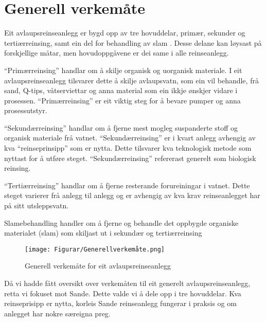 \section{Generell verkemåte}

Eit avlaupsreinseanlegg er bygd opp av tre hovuddelar, primær, sekunder og tertiærreinsing,
samt ein del for behandling av slam \citep{Regjeriga}.
Desse delane kan løysast på forskjellige måtar, men hovudoppgåvene er dei same
i alle reinseanlegg.

``Primærreinsing'' handlar om å skilje organisk og uorganisk materiale.
I eit avlaupsreinseanlegg tilsvarer dette å skilje avlaupsvatn, 
som ein vil behandle, frå sand, Q-tips, våtserviettar og anna material som ein ikkje ønskjer vidare i prosessen.\newline
``Primærreinsing'' er eit viktig steg for å bevare pumper og anna prosessutstyr.

``Sekundærreinsing'' handlar om å fjerne mest mogleg suspanderte stoff og organisk materiale frå vatnet.
``Sekundærreinsing'' er i kvart anlegg avhengig av kva ``reinseprinsipp'' som er nytta. 
Dette tilsvarer kva teknologisk metode som nyttast for å utføre steget.
``Sekundærreinsing'' refererast generelt som biologisk reinsing.

``Tertiærreinsing'' handlar om å fjerne resterande forureiningar i vatnet.
Dette steget varierer frå anlegg til anlegg og er
avhengig av kva krav reinseanlegget har på sitt utsleppsvatn.

Slamebehandling handler om å fjerne og behandle det oppbygde organiske materialet (slam)
som skiljast ut i sekundær og tertiærreinsing 

\begin{figure}[htbp]
    \centering
    \texttt{[image: Figurar/Generellverkemåte.png]}
    \caption{Generell verkemåte for eit avlaupsreinseanlegg}\label{fig:GenerellVerkemåte}
\end{figure}

Då vi hadde fått oversikt over verkemåten til eit generelt avlaupsreinseanlegg, retta vi fokuset mot Sande.
Dette valde vi å dele opp i tre hovuddelar. Kva reinseprisipp er nytta, korleis Sande reinseanlegg
fungerar i praksis og om anlegget har nokre særeigna preg.

